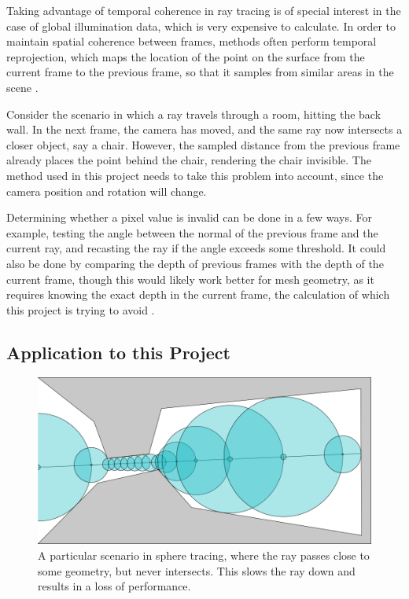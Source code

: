 Taking advantage of temporal coherence in ray tracing is of special interest in the case of global illumination data, which is very expensive to calculate. In order to maintain spatial coherence between frames, methods often perform temporal reprojection, which maps the location of the point on the surface from the current frame to the previous frame, so that it samples from similar areas in the scene \cite{scherzer2012temporal}.\newline

Consider the scenario in which a ray travels through a room, hitting the back wall. In the next frame, the camera has moved, and the same ray now intersects a closer object, say a chair. However, the sampled distance from the previous frame already places the point behind the chair, rendering the chair invisible. The method used in this project needs to take this problem into account, since the camera position and rotation will change.\newline

Determining whether a pixel value is invalid can be done in a few ways. For example, testing the angle between the normal of the previous frame and the current ray, and recasting the ray if the angle exceeds some threshold. It could also be done by comparing the depth of previous frames with the depth of the current frame, though this would likely work better for mesh geometry, as it requires knowing the exact depth in the current frame, the calculation of which this project is trying to avoid \cite{weier2016foveated}.

\subsection{Application to this Project}

\begin{figure} [ht]
	\centering
	\includegraphics[width=0.75\linewidth, frame]{Images/Sphere-Tracing-Bottleneck.png}
	\caption{A particular scenario in sphere tracing, where the ray passes close to some geometry, but never intersects. This slows the ray down and results in a loss of performance.}
	\label{figure:sphere-tracing-bottleneck}
\end{figure}

